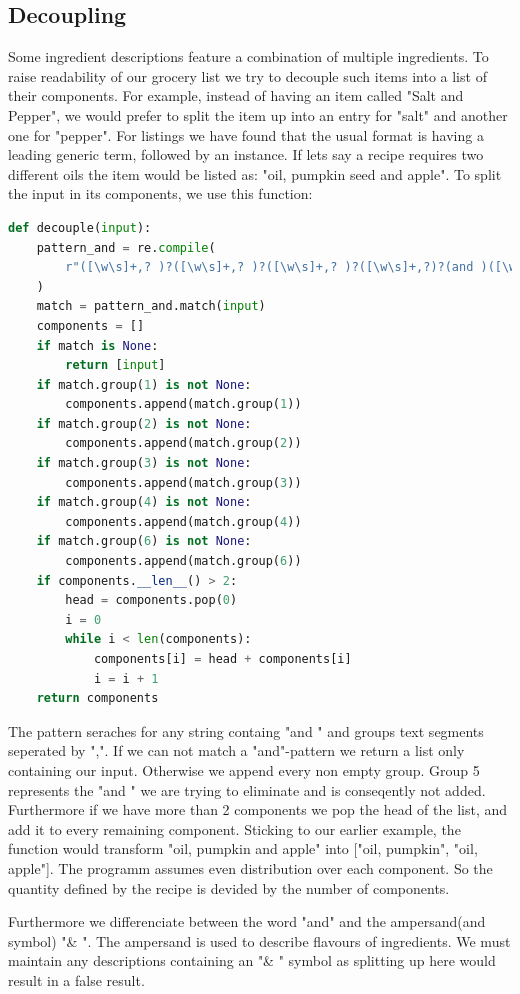\subsection{Decoupling}\label{sub:decoupling}
Some ingredient descriptions feature a combination of multiple ingredients. To raise readability of our grocery list we try to decouple such items into a list of their components. For example, instead of having an item called "Salt and Pepper", we would prefer to split the item up into an entry for "salt" and another one for "pepper". For listings we have found that the usual format is having a leading generic term, followed by an instance. If lets say a recipe requires two different oils the item would be listed as: "oil, pumpkin seed and  apple". To split the input in its components, we use this function:
\begin{lstlisting}[language=python]
def decouple(input):
    pattern_and = re.compile(
        r"([\w\s]+,? )?([\w\s]+,? )?([\w\s]+,? )?([\w\s]+,?)?(and )([\w\s]+)"
    )
    match = pattern_and.match(input)
    components = []
    if match is None:
        return [input]
    if match.group(1) is not None:
        components.append(match.group(1))
    if match.group(2) is not None:
        components.append(match.group(2))
    if match.group(3) is not None:
        components.append(match.group(3))
    if match.group(4) is not None:
        components.append(match.group(4))
    if match.group(6) is not None:
        components.append(match.group(6))
    if components.__len__() > 2:
        head = components.pop(0)
        i = 0
        while i < len(components):
            components[i] = head + components[i]
            i = i + 1
    return components
\end{lstlisting}
The pattern seraches for any string containg "and " and groups text segments seperated by ",". If we can not match a "and"-pattern we return a list only containing our input. Otherwise we append every non empty group. Group 5 represents the "and " we are trying to eliminate and is conseqently not added.
Furthermore if we have more than 2 components we pop the head of the list, and add it to every remaining component. Sticking to our earlier example, the function would transform "oil, pumpkin and apple" into ["oil, pumpkin", "oil, apple"].
The programm assumes even distribution over each component. So the quantity defined by the recipe is devided by the number of components.

Furthermore we differenciate between the word "and" and the ampersand(and symbol) "\& ". The ampersand is used to describe flavours of ingredients. We must maintain any descriptions containing an "\& " symbol as splitting up here would result in a false result. 
